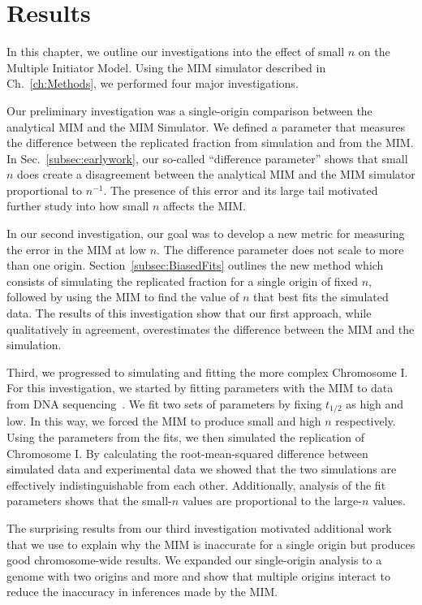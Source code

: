 \chapter{Results}
\label{ch:Results}

In this chapter, we outline our investigations into the effect of small $n$ on the Multiple Initiator Model.
Using the MIM simulator described in Ch.~\ref{ch:Methods}, we performed four major investigations.

Our preliminary investigation was a single-origin comparison between the analytical MIM and the MIM Simulator.
We defined a parameter that measures the difference between the replicated fraction from simulation and from the MIM.
In Sec.~\ref{subsec:earlywork}, our so-called ``difference parameter'' shows that small $n$ does create a disagreement between the analytical MIM and the MIM simulator proportional to $n^{-1}$.
The presence of this error and its large tail motivated further study into how small $n$ affects the MIM.

In our second investigation, our goal was to develop a new metric for measuring the error in the MIM at low $n$.
The difference parameter does not scale to more than one origin.
Section~\ref{subsec:BiasedFits} outlines the new method which consists of simulating the replicated fraction for a single origin of fixed $n$, followed by using the MIM to find the value of $n$ that best fits the simulated data.
The results of this investigation show that our first approach, while qualitatively in agreement, overestimates the difference between the MIM and the simulation.

Third, we progressed to simulating and fitting the more complex Chromosome I.
For this investigation, we started by fitting parameters with the MIM to data from DNA sequencing~\cite{StochasticTermination}.
We fit two sets of parameters by fixing $t_{1/2}$ as high and low.
In this way, we forced the MIM to produce small and high $n$ respectively.
Using the parameters from the fits, we then simulated the replication of Chromosome I.
By calculating the root-mean-squared difference between simulated data and experimental data we showed that the two simulations are effectively indistinguishable from each other.
Additionally, analysis of the fit parameters shows that the small-$n$ values are proportional to the large-$n$ values.

The surprising results from our third investigation motivated additional work that we use to explain why the MIM is inaccurate for a single origin but produces good chromosome-wide results.
We expanded our single-origin analysis to a genome with two origins and more and show that multiple origins interact to reduce the inaccuracy in inferences made by the MIM.

